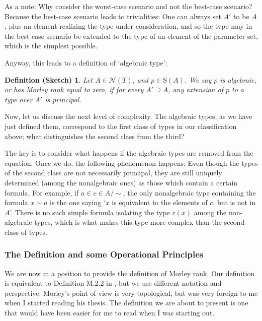 \documentclass{article}
\newtheorem{defsketch}[theorem]{Definition (Sketch)}
\theoremstyle{nonumberplain}
\newcommand{\calN}{\mathcal{N}}
\newcommand{\Stone}{\mathrm{S}}
\begin{document}
As a note: Why consider the worst-case scenario and not the best-case scenario? Because the best-case scenario leads to trivialities: One can always set $A'$ to be $A$, plus an element realizing the type under consideration, and so the type may in the best-case scenario be extended to the type of an element of the parameter set, which is the simplest possible.

Anyway, this leads to a definition of `algebraic type':

\begin{defsketch}
Let $A \in \calN(T)$, and $p \in \Stone(A)$. We say $p$ is \emph{algebraic}, or has Morley rank equal to zero, if for every $A' \supseteq A$, any extension of $p$ to a type over $A'$ is principal.
\end{defsketch}

Now, let us discuss the next level of complexity. The algebraic types, as we have just defined them, correspond to the first class of types in our classification above; what distinguishes the second class from the third?

The key is to consider what happens if the algebraic types are removed from the equation. Once we do, the following phenomenon happens: Even though the types of the second class are not necessarily principal, they are still uniquely determined (among the nonalgebraic ones) as those which contain a certain formula. For example, if $a \in c \in A/{\sim}$, the only nonalgebraic type containing the formula $x \sim a$ is the one saying `$x$ is equivalent to the elements of $c$, but is not in $A$'. There is no such simple formula isolating the type $r(x)$ among the non-algebraic types, which is what makes this type more complex than the second class of types.

\subsubsection{The Definition and some Operational Principles}

We are now in a position to provide the definition of Morley rank. Our definition is equivalent to Definition M.2.2 in \cite{morley}, but we use different notation and perspective. Morley's point of view is very topological, but was very foreign to me when I started reading his thesis. The definition we are about to present is one that would have been easier for me to read when I was starting out.
\end{document}
